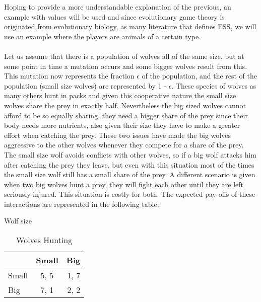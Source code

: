 Hoping to provide a more understandable explanation of the previous, an example with values will be used and since evolutionary game theory is originated from evolutionary biology, as many literature that defines ESS, we will use an example where the players are animals of a certain type.
\\\\Let us assume that there is a population of wolves all of the same size, but at some point in time a mutation occurs and some bigger wolves result from this. This mutation now represents the fraction $\epsilon$ of the population, and the rest of the population (small size wolves) are represented by 1 - $\epsilon$. These species of wolves as many others hunt in packs and given this cooperative nature the small size wolves share the prey in exactly half. Nevertheless the big sized wolves cannot afford to be so equally sharing, they need a bigger share of the prey since their body needs more nutrients, also given their size they have to make a greater effort when catching the prey. These two issues have made the big wolves aggressive to the other wolves whenever they compete for a share of the prey. The small size wolf avoids conflicts with other wolves, so if a big wolf attacks him after catching the prey they leave, but even with this situation most of the times the small size wolf still has a small share of the prey. A different scenario is given when two big wolves hunt a prey, they will fight each other until they are left seriously injured. This situation is costly for both. The expected pay-offs of these interactions are represented in the following table:

\begin{table}[h]
\begin{center}
Wolf size


\begin{tabular}{|l|c|r|}
\hline
 & Small & Big \\ 
\hline
Small & 5, 5 & 1, 7\\
\hline
 Big & 7, 1 & 2, 2\\
\hline
\end{tabular}
\caption{Wolves Hunting}
\label{tab:wolveshunt}
\end{center}
\end{table}

